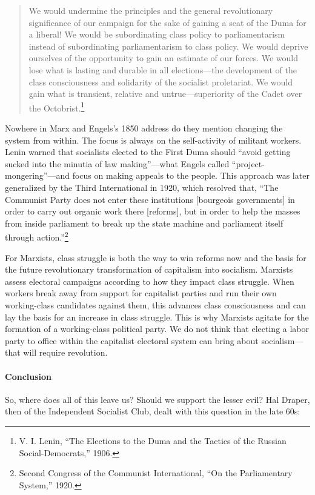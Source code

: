 \blockquote{We would undermine the principles and the general revolutionary significance of our campaign for the sake of gaining a seat of the Duma for a liberal! We would be subordinating class policy to parliamentarism instead of subordinating parliamentarism to class policy. We would deprive ourselves of the opportunity to gain an estimate of our forces. We would lose what is lasting and durable in all elections---the development of the class consciousness and solidarity of the socialist proletariat. We would gain what is transient, relative and untrue---superiority of the Cadet over the Octobrist.\footnote{V. I. Lenin, ``The Elections to the Duma and the Tactics of the Russian Social-Democrats,'' 1906.}}

Nowhere in Marx and Engels's 1850 address do they mention changing the system from within. The focus is always on the self-activity of militant workers. Lenin warned that socialists elected to the First Duma should ``avoid getting sucked into the minutia of law making''---what Engels called ``project-mongering''---and focus on making appeals to the people. This approach was later generalized by the Third International in 1920, which resolved that, ``The Communist Party does not enter these institutions [bourgeois governments] in order to carry out organic work there [reforms], but in order to help the masses from inside parliament to break up the state machine and parliament itself through action.''\footnote{Second Congress of the Communist International, ``On the Parliamentary System,'' 1920.}

For Marxists, class struggle is both the way to win reforms now and the basis for the future revolutionary transformation of capitalism into socialism. Marxists assess electoral campaigns according to how they impact class struggle. When workers break away from support for capitalist parties and run their own working-class candidates against them, this advances class consciousness and can lay the basis for an increase in class struggle. This is why Marxists agitate for the formation of a working-class political party. We do not think that electing a labor party to office within the capitalist electoral system can bring about socialism---that will require revolution.

\paragraph{Conclusion}

So, where does all of this leave us? Should we support the lesser evil? Hal Draper, then of the Independent Socialist Club, dealt with this question in the late 60s:

